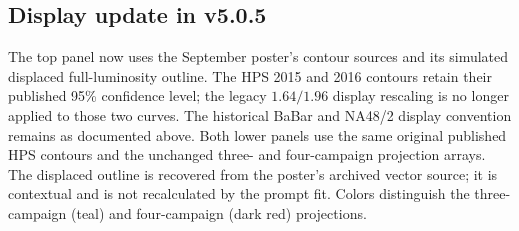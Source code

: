 \subsection{Display update in v5.0.5}
The top panel now uses the September poster's contour sources and its
simulated displaced full-luminosity outline. The HPS 2015 and 2016 contours
retain their published 95\% confidence level; the legacy $1.64/1.96$ display
rescaling is no longer applied to those two curves. The historical BaBar
and NA48/2 display convention remains as documented above. Both lower
panels use the same original published HPS contours and the unchanged
three- and four-campaign projection arrays. The displaced outline is
recovered from the poster's archived vector source; it is contextual and
is not recalculated by the prompt fit. Colors distinguish the three-campaign
(teal) and four-campaign (dark red) projections.
